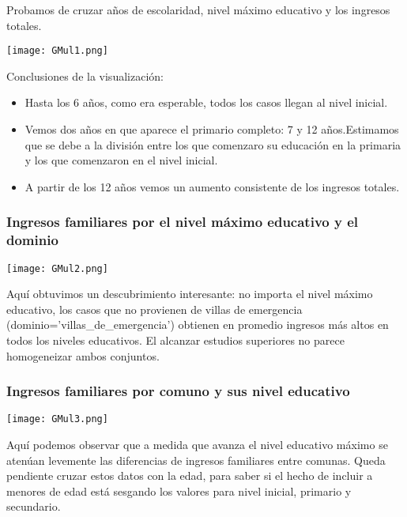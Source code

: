 \documentclass[a4paper]{article}
\begin{document}
            Probamos de cruzar años de escolaridad, nivel máximo educativo y los ingresos totales.

            \begin{center}
                \texttt{[image: GMul1.png]}
            \end{center}

            Conclusiones de la visualización:
            \begin{itemize}
                \item Hasta los 6 años, como era esperable, todos los casos llegan al nivel inicial.
                \item Vemos dos años en que aparece el primario completo: 7 y 12 años.Estimamos que se debe a la división entre los que comenzaro su educación en la primaria y los que comenzaron en el nivel inicial.
                \item A partir de los 12 años vemos un aumento consistente de los ingresos totales.
            \end{itemize}
        
        \begin{landscape}
            
        \subsubsection*{Ingresos familiares por el nivel máximo educativo y el dominio}

            \texttt{[image: GMul2.png]}

            Aquí obtuvimos un descubrimiento interesante: no importa el nivel máximo educativo, los casos que no provienen de villas de emergencia (dominio='villas\_de\_emergencia') obtienen en promedio ingresos más altos en todos los niveles educativos. El alcanzar estudios superiores no parece homogeneizar ambos conjuntos.

        \end{landscape}

        \subsubsection*{Ingresos familiares por comuno y sus nivel educativo}

            \texttt{[image: GMul3.png]}

            Aquí podemos observar que a medida que avanza el nivel educativo máximo se atenúan levemente las diferencias de ingresos familiares entre comunas. Queda pendiente cruzar estos datos con la edad, para saber si el hecho de incluir a menores de edad está sesgando los valores para nivel inicial, primario y secundario.
\end{document}
